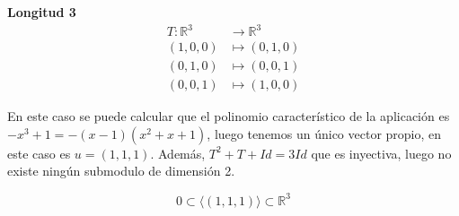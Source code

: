 \textbf{Longitud 3}%
\[
\begin{aligned}
  T:\mathbb{R}^3 &\rightarrow \mathbb{R}^3\\
  (1,0,0) &\mapsto (0,1,0)\\
  (0,1,0) &\mapsto (0,0,1)\\
  (0,0,1) &\mapsto (1,0,0)
\end{aligned}
\]

En este caso se puede calcular que el polinomio característico de la aplicación
es \(-x^3 + 1 = -(x-1)(x^2+x+1)\), luego tenemos un único vector propio, en este
caso es \(u = (1,1,1)\). Además, \(T^2 + T +Id = 3Id\) que es inyectiva, luego
no existe ningún submodulo de dimensión 2.

\[
        0 \subset \langle (1,1,1) \rangle \subset \mathbb{R}^3
\]
